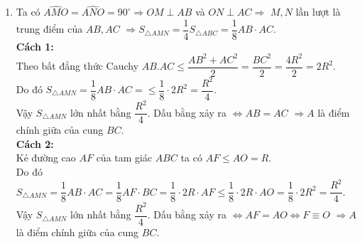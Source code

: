 \begin{bt}
{\begin{enumerate}
			$\Rightarrow \widehat{ACP}=\widehat{HOP}\,\,\,(1)$.\\
			Ta lại có:\\
			$\widehat{APC}=\widehat{ABC}$ (hai góc nội tiếp cùng chắn cung $AC$ của đường tròn $(O)$)\\
			$\widehat{ABC}=\widehat{HPO}$ (hai góc nội tiếp cùng chắn cung $OH$ của đường tròn ngoại tiếp $PHOB$)\\
			$\Rightarrow \widehat{APC}=\widehat{HPO}\,\,\,(2)$.\\
			Từ $(1)$ và $(2)$ $\Rightarrow \triangle APC \backsim \triangle HPO$ (g.g) $\Rightarrow \dfrac{AC}{OH}=\dfrac{PC}{PO}\Rightarrow \dfrac{OH\cdot PC}{AC}=PO=R$.\\
			Vậy $\dfrac{OH.PC}{AC}=R$ không phụ thuộc vào vị trí của các điểm $B,C$.
			\item 
			Ta có $\widehat{AMO}=\widehat{ANO}=90^\circ\Rightarrow OM \perp AB$ và $ON \perp AC \Rightarrow$ $M,N$ lần lượt là trung điểm của $AB,AC$ $\Rightarrow S_{\triangle AMN}=\dfrac{1}{4}S_{\triangle ABC}=\dfrac{1}{8}AB\cdot AC$.\\
			{\bf Cách 1:}\\
			Theo bất đẳng thức Cauchy $AB.AC\leq\dfrac{AB^2+AC^2}{2}=\dfrac{BC^2}{2}=\dfrac{4R^2}{2}=2R^2$.\\
			Do đó
			$S_{\triangle AMN}=\dfrac{1}{8}AB\cdot AC=\leq\dfrac{1}{8}\cdot 2R^2=\dfrac{R^2}{4}$.\\
			Vậy $ S_{\triangle AMN}$ lớn nhất bằng $\dfrac{R^2}{4}$. Dấu bằng xảy ra $\Leftrightarrow AB=AC$ $\Rightarrow A$ là điểm chính giữa của cung $BC$.\\
			{\bf Cách 2:}\\
			Kẻ đường cao $AF$ của tam giác $ABC$ ta có $AF\leq AO=R$.\\
			Do đó
			$S_{\triangle AMN}=\dfrac{1}{8}AB\cdot AC=\dfrac{1}{8}AF\cdot BC=\dfrac{1}{8}\cdot 2R\cdot AF\leq \dfrac{1}{8}\cdot 2R\cdot AO=\dfrac{1}{8}\cdot 2R^2=\dfrac{R^2}{4}$.\\
			Vậy $ S_{\triangle AMN}$ lớn nhất bằng $\dfrac{R^2}{4}$. Dấu bằng xảy ra $\Leftrightarrow AF=AO\Leftrightarrow F\equiv O$ $\Rightarrow A$ là điểm chính giữa của cung $BC$.
		\end{enumerate}	
		
	}
\end{bt}


